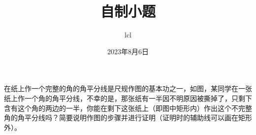 \documentclass[11pt]{article}
\title{自制小题}
\date{2023年8月6日}
\author{lcl}
\begin{document}
\maketitle
在纸上作一个完整的角的角平分线是尺规作图的基本功之一，如图，某同学在一张纸上作一个角的角平分线，不幸的是，那张纸有一半因不明原因被撕掉了，只剩下含有这个角的两边的一半，你能在剩下这张纸上（即图中矩形内）作出这个不完整角的角平分线吗？简要说明作图的步骤并进行证明（证明时的辅助线可以画在矩形外）。
\begin{figure}[!htbp]
    \raggedleft
\end{figure}
\end{document}
